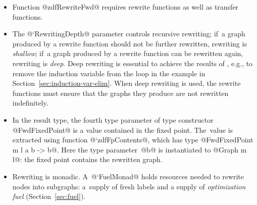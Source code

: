 \documentclass[blockstyle,preprint,natbib,nocopyrightspace]{sigplanconf}
\def\authornote#1{\unskip\relax}
\newcommand{\simon}[1]{\authornote{SLPJ: #1}}
\newcommand{\john}[1]{\authornote{JD: #1}}
\newcommand\secref[1]{Section~\ref{sec:#1}}
\begin{document}
\begin{itemize}
\item
Function @zdfRewriteFwd@ requires rewrite functions as well as transfer
functions.
\item
The @`RewritingDepth@ parameter controls recursive rewriting;
if~a graph produced by a rewrite function should not be further rewritten,
rewriting is \emph{shallow};
if~a graph produced by a rewrite function can be rewritten again,
rewriting is \emph{deep}.
\ifcutting\else
Deep rewriting is essential to achieve the results of
\citet{lerner-grove-chambers:2002}, e.g., to remove the induction
variable from the loop in the example in \secref{induction-var-elim}.\john{Deep rewriting isn't needed for this example; interleaving is...}
\fi
\ifcutting\else
When deep rewriting is used, the rewrite functions must
ensure that the graphs they produce are not rewritten indefinitely.
\fi
\item
In the result type, the fourth type parameter of type constructor
@FwdFixedPoint@ is a value contained in the fixed point.
The~value is extracted using function @`zdfFpContents@, which has
type @FwdFixedPoint m l a b -> b@.
Here the type parameter~@b@ is instantiated to @Graph m l@: the fixed point
contains the rewritten graph.
\item
Rewriting is monadic.
A~@`FuelMonad@ holds resources needed to
rewrite nodes into subgraphs:
a~supply of fresh labels and a supply of \emph{optimization fuel}
(\secref{fuel}). 
\end{itemize}
\end{document}
